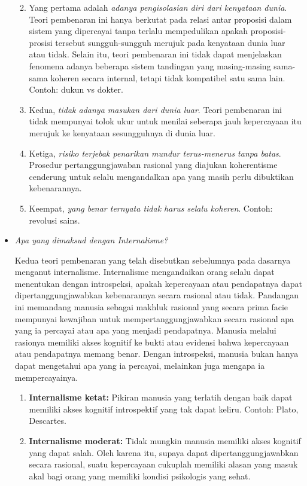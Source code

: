 \documentclass[10pt,a4paper]{article}
\def\tightlist{}
\begin{document}
\begin{multicols}{2}
\begin{itemize}
  \begin{enumerate}
  \def\labelenumi{\arabic{enumi}.}
  \tightlist
  \item
    Yang pertama adalah \emph{adanya pengisolasian diri dari kenyataan
    dunia}. Teori pembenaran ini hanya berkutat pada relasi antar
    proposisi dalam sistem yang dipercayai tanpa terlalu mempedulikan
    apakah proposisi-prosisi tersebut sungguh-sungguh merujuk pada
    kenyataan dunia luar atau tidak. Selain itu, teori pembenaran ini
    tidak dapat menjelaskan fenomena adanya beberapa sistem tandingan
    yang masing-masing sama-sama koheren secara internal, tetapi tidak
    kompatibel satu sama lain. Contoh: dukun vs dokter.
  \item
    Kedua, \emph{tidak adanya masukan dari dunia luar}. Teori pembenaran
    ini tidak mempunyai tolok ukur untuk menilai seberapa jauh
    kepercayaan itu merujuk ke kenyataan sesungguhnya di dunia luar.
  \item
    Ketiga, \emph{risiko terjebak penarikan mundur terus-menerus tanpa
    batas}. Prosedur pertanggungjawaban rasional yang diajukan
    koherentisme cenderung untuk selalu mengandalkan apa yang masih
    perlu dibuktikan kebenarannya.
  \item
    Keempat, \emph{yang benar ternyata tidak harus selalu koheren}.
    Contoh: revolusi sains.
  \end{enumerate}
\item
  \emph{Apa yang dimaksud dengan Internalisme?}

  Kedua teori pembenaran yang telah disebutkan sebelumnya pada dasarnya
  menganut internalisme. Internalisme mengandaikan orang selalu dapat
  menentukan dengan introspeksi, apakah kepercayaan atau pendapatnya
  dapat dipertanggungjawabkan kebenarannya secara rasional atau tidak.
  Pandangan ini memandang manusia sebagai makhluk rasional yang secara
  prima facie mempunyai kewajiban untuk mempertanggungjawabkan secara
  rasional apa yang ia percayai atau apa yang menjadi pendapatnya.
  Manusia melalui rasionya memiliki akses kognitif ke bukti atau
  evidensi bahwa kepercayaan atau pendapatnya memang benar. Dengan
  introspeksi, manusia bukan hanya dapat mengetahui apa yang ia
  percayai, melainkan juga mengapa ia mempercayainya.

  \begin{enumerate}
  \def\labelenumi{\arabic{enumi}.}
  \tightlist
  \item
    \textbf{Internalisme ketat:} Pikiran manusia yang terlatih dengan
    baik dapat memiliki akses kognitif introspektif yang tak dapat
    keliru. Contoh: Plato, Descartes.
  \item
    \textbf{Internalisme moderat:} Tidak mungkin manusia memiliki akses
    kognitif yang dapat salah. Oleh karena itu, supaya dapat
    dipertanggungjawabkan secara rasional, suatu kepercayaan cukuplah
    memiliki alasan yang masuk akal bagi orang yang memiliki kondisi
    psikologis yang sehat.
  \end{enumerate}


\end{itemize}
\end{multicols}
\end{document}
